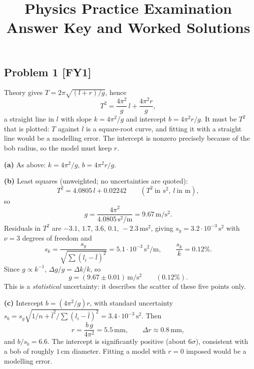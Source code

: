 \documentclass[11pt,a4paper]{article}
\title{\vspace{-1.4cm}\bfseries Physics Practice Examination\\Answer Key and Worked Solutions}
\author{}
\date{}
\newcommand{\problem}[2]{\subsection*{Problem #1 \; \textnormal{\small[#2]}}}
\newcommand{\unit}[1]{\,\mathrm{#1}}
\begin{document}
\maketitle
\vspace{-2em}

\problem{1}{FY1}
Theory gives $T=2\pi\sqrt{(l+r)/g}$, hence
\[
  T^2 = \frac{4\pi^2}{g}\,l + \frac{4\pi^2 r}{g},
\]
a straight line in $l$ with slope $k=4\pi^2/g$ and intercept
$b=4\pi^2r/g$. It must be $T^2$ that is plotted: $T$ against $l$ is a
square-root curve, and fitting it with a straight line would be a modelling
error. The intercept is nonzero precisely because of the bob radius, so the
model must keep $r$.

\textbf{(a)} As above: $k=4\pi^2/g$, $b=4\pi^2r/g$.

\textbf{(b)} Least squares (unweighted; no uncertainties are quoted):
\[
  T^2 = 4.0805\,l + 0.02242\qquad(T^2\ \text{in}\ \unit{s^2},\ l\ \text{in m}),
\]
so
\[
  g=\frac{4\pi^2}{4.0805\unit{s^2/m}} = 9.67\unit{m/s^2}.
\]
Residuals in $T^2$ are $-3.1,\,1.7,\,3.6,\,0.1,\,-2.3\unit{ms^2}$, giving
$s_y=3.2\cdot10^{-3}\unit{s^2}$ with $\nu=3$ degrees of freedom and
\[
  s_k=\frac{s_y}{\sqrt{\sum (l_i-\bar l)^2}} = 5.1\cdot10^{-3}\unit{s^2/m},
  \qquad \frac{s_k}{k}=0.12\%.
\]
Since $g\propto k^{-1}$, $\Delta g/g=\Delta k/k$, so
\[
  \boxed{g = (9.67\pm0.01)\unit{m/s^2}}\qquad(0.12\%).
\]
This is a \emph{statistical} uncertainty: it describes the scatter of these
five points only.

\textbf{(c)} Intercept $b=(4\pi^2/g)r$, with standard uncertainty
$s_b=s_y\sqrt{1/n+\bar l^2/\sum(l_i-\bar l)^2}=3.4\cdot10^{-3}\unit{s^2}$.
Then
\[
  r=\frac{b\,g}{4\pi^2}=5.5\unit{mm},\qquad
  \Delta r\approx0.8\unit{mm},
\]
and $b/s_b=6.6$. The intercept is significantly positive (about
$6\sigma$), consistent with a bob of roughly $1\unit{cm}$ diameter.
Fitting a model with $r=0$ imposed would be a modelling error.
\end{document}
